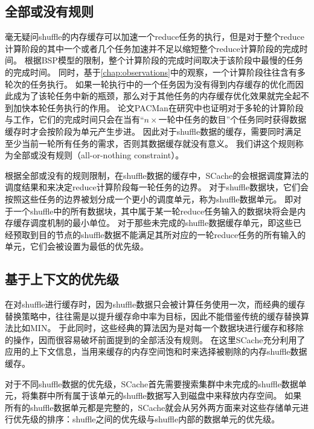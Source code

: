 \subsection{全部或没有规则}

毫无疑问shuffle的内存缓存可以加速一个reduce任务的执行，但是对于整个reduce计算阶段的其中一个或者几个任务加速并不足以缩短整个reduce计算阶段的完成时间。
根据BSP模型的限制，整个计算阶段的完成时间取决于该阶段中最慢的任务的完成时间。
同时，基于\ref{chap:observations}中的观察，一个计算阶段往往含有多轮次的任务执行。
如果一轮执行中的一个任务因为没有得到内存缓存的优化而因此成为了该轮任务中新的瓶颈，那么对于其他任务的内存缓存优化效果就完全起不到加快本轮任务执行的作用。
论文PACMan\cite{pacman}在研究中也证明对于多轮的计算阶段与工作，它们的完成时间只会在当有“$n \times$一轮中任务的数目”个任务同时获得数据缓存时才会按阶段为单元产生步进。
因此对于shuffle数据的缓存，需要同时满足至少当前一轮所有任务的需求，否则其数据缓存就没有意义。
我们讲这个规则称为全部或没有规则（all-or-nothing constraint）。

根据全部或没有的规则限制，在shuffle数据的缓存中，SCache的会根据调度算法的调度结果和来决定reduce计算阶段每一轮任务的边界。
对于shuffle数据块，它们会按照这些任务的边界被划分成一个更小的调度单元，称为shuffle数据单元。
即对于一个shuffle中的所有数据块，其中属于某一轮reduce任务输入的数据块将会是内存缓存调度机制的最小单位。
对于那些未完成的shuffle数据缓存单元，即这些已经预取到目的节点的shuffle数据不能满足其所对应的一轮reduce任务的所有输入的单元，它们会被设置为最低的优先级。


\subsection{基于上下文的优先级}

在对shuffle进行缓存时，因为shuffle数据只会被计算任务使用一次，而经典的缓存替换策略中，往往需是以提升缓存命中率为目标，因此不能借鉴传统的缓存替换算法比如MIN\cite{min}。
于此同时，这些经典的算法因为是对每一个数据块进行缓存和移除的操作，因而很容易破坏前面提到的全部活没有规则。
在这里SCache充分利用了应用的上下文信息，当用来缓存的内存空间饱和时来选择被剔除的内存shuffle数据缓存。

对于不同shuffle数据的优先级，SCache首先需要搜索集群中未完成的shuffle数据单元，将集群中所有属于该单元的shuffle数据写入到磁盘中来释放内存空间。
如果所有的shuffle数据单元都是完整的，SCache就会从另外两方面来对这些存储单元进行优先级的排序：shuffle之间的优先级与shuffle内部的数据单元的优先级。

